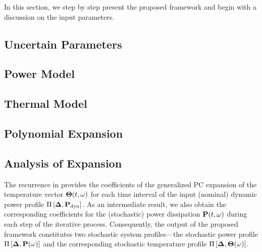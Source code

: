 In this section, we step by step present the proposed framework and begin with a discussion on the input parameters.

\subsection{Uncertain Parameters} 


\subsection{Power Model} 


\subsection{Thermal Model} 


\subsection{Polynomial Expansion} 


\subsection{Analysis of Expansion}
The recurrence in  provides the coefficients of the generalized PC expansion of the temperature vector ${\boldsymbol\Theta}(t, \omega)$ for each time interval of the input (nominal) dynamic power profile $\prof{\mP_\dyn}$. As an intermediate result, we also obtain the corresponding coefficients for the (stochastic) power dissipation $\mathbf{P}(t, \omega)$ during each step of the iterative process. Consequently, the output of the proposed framework constitutes two stochastic system profiles---the stochastic power profile $\prof{\mP(\o)}$ and the corresponding stochastic temperature profile $\Pi\left[\boldsymbol{\Delta}, {\boldsymbol\Theta}(\omega)\right]$.

